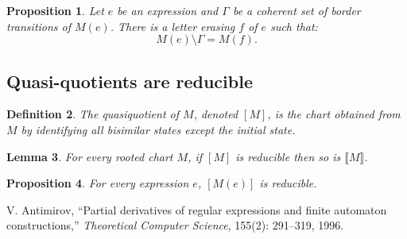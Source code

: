 \documentclass{article}
\newcommand{\quotient}[1]{\llbracket#1\rrbracket}          %
\newtheorem{definition}{Definition}[section]
\newtheorem{lemma}[definition]{Lemma}
\newtheorem{proposition}[definition]{Proposition}
\begin{document}
\begin{proposition} Let $e$ be an expression and $\Gamma$ be a coherent set of border transitions of $M(e)$. There is a letter erasing $f$ of $e$ such that:
  $$ M(e)\setminus \Gamma = M(f).$$
\end{proposition}


\subsection{Quasi-quotients are reducible}

\begin{definition}
  The quasiquotient of $M$, denoted $[M]$, is the chart obtained from $M$ by identifying all bisimilar states except the initial state.
\end{definition}

\begin{lemma}
  For every rooted chart $M$, if $[M]$ is reducible then so is $\quotient{M}$.
\end{lemma}

\begin{proposition} For every expression $e$, $[M(e)]$ is reducible.\label{prop:quasi-quotient-of-Milner-chart-is-labelable}
\end{proposition}

  \begin{thebibliography}{9}
V. Antimirov, ``Partial derivatives of regular expressions and finite automaton constructions,'' \emph{Theoretical Computer Science}, 155(2): 291--319, 1996.
\end{thebibliography}
\end{document}
